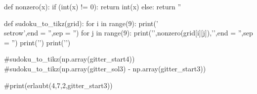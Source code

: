 def nonzero(x):
    if (int(x) != 0):
        return int(x)
    else:
        return ''

def sudoku_to_tikz(grid):
    for i in range(9):
        print('\\setrow',end = '',sep = '')
        for j in range(9):
            print('{',nonzero(grid[i][j]),'}',end = '',sep = '')
        print('\n')
    print('\n\n')

#sudoku_to_tikz(np.array(gitter_start4))
#sudoku_to_tikz(np.array(gitter_sol3) - np.array(gitter_start3))

#print(erlaubt(4,7,2,gitter_start3))

